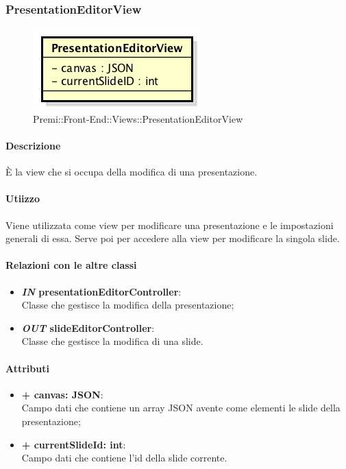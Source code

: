 	
\subsubsection{PresentationEditorView}
	\begin{figure}[h]
		\centering
		\includegraphics[width=0.4\linewidth]{img/premi_front_end_views_presentationeditorview}
		\caption[Premi::Front-End::Views::PresentationEditorView]{Premi::Front-End::Views::PresentationEditorView}
	\end{figure}
	
	\paragraph{Descrizione}
	È la view che si occupa della modifica di una presentazione.
	
	\paragraph{Utiizzo}
	Viene utilizzata come view per modificare una presentazione e le impostazioni generali di essa. Serve poi per accedere alla view per modificare la singola slide.
	
	\paragraph{Relazioni con le altre classi}
	\begin{itemize}
		\item \textbf{\textit{IN} presentationEditorController}:\\
		Classe che gestisce la modifica della presentazione;
		\item \textbf{\textit{OUT} slideEditorController}:\\
		Classe che gestisce la modifica di una slide.
	\end{itemize}
	
	\paragraph{Attributi}
	\begin{itemize}
		\item \textbf{+ canvas: JSON}:\\
		Campo dati che contiene un array JSON avente come elementi le slide della presentazione;
		\item \textbf{+ currentSlideId: int}:\\
		Campo dati che contiene l'id della slide corrente.
	\end{itemize}
	
